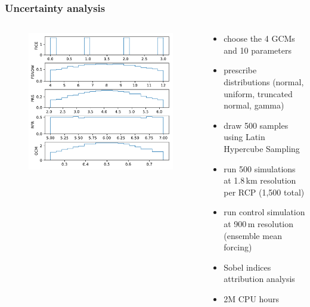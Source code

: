 \documentclass[hide notes,intlimits]{beamer}
\begin{document}
\begin{frame}
  \frametitle{Uncertainty analysis}
  \begin{columns}[c]
    \begin{column}{.3\linewidth}
    \begin{figure}
    \includegraphics[width=\textwidth]{parameter_histograms}
    \end{figure}
    \end{column}
    \begin{column}{.7\linewidth}
  \begin{itemize}
  \item choose the 4 GCMs and 10 parameters
  \item prescribe distributions (normal, uniform, truncated normal, gamma)
  \item draw 500 samples using Latin Hypercube Sampling
  \item run 500 simulations at 1.8\,km resolution per RCP (1,500 total)
  \item run control simulation at 900\,m resolution (ensemble mean forcing)
  \item Sobel indices attribution analysis
  \item 2M CPU hours
  \end{itemize}
    \end{column}
  \end{columns}
\end{frame}
\end{document}

